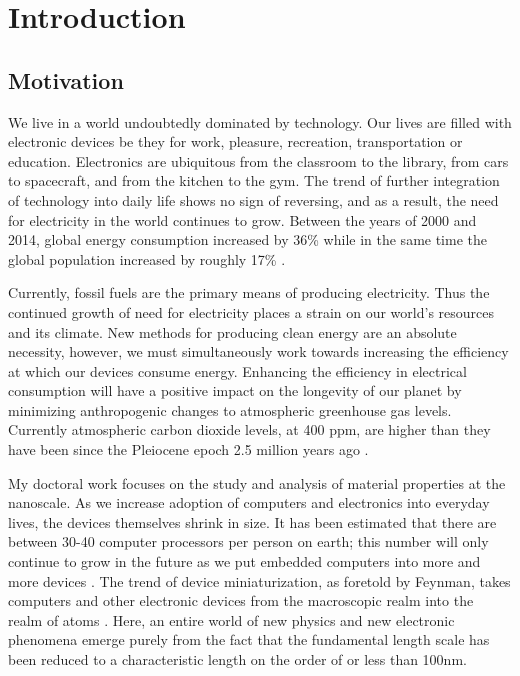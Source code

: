 \chapter{\sc Introduction}
\label{ch:Introduction}

\section{Motivation}
We live in a world undoubtedly dominated by technology. Our lives are filled with electronic devices be they for work, pleasure, recreation, transportation or education. Electronics are ubiquitous from the classroom to the library, from cars to spacecraft, and from the kitchen to the gym. The trend of further integration of technology into daily life shows no sign of reversing, and as a result, the need for electricity in the world continues to grow. Between the years of 2000 and 2014, global energy consumption increased by 36\% while in the same time the global population increased by roughly 17\% \cite{enerdata, popdata}.

Currently, fossil fuels are the primary means of producing electricity. Thus the continued growth of need for electricity places a strain on our world's resources and its climate. New methods for producing clean energy are an absolute necessity, however, we must simultaneously work towards increasing the efficiency at which our devices consume energy. Enhancing the efficiency in electrical consumption will have a positive impact on the longevity of our planet by minimizing anthropogenic changes to atmospheric greenhouse gas levels. Currently atmospheric carbon dioxide levels, at 400 ppm, are higher than they have been since the Pleiocene epoch 2.5 million years ago \cite{400ppm}.

My doctoral work focuses on the study and analysis of material properties at the nanoscale. As we increase adoption of computers and electronics into everyday lives, the devices themselves shrink in size. It has been estimated that there are between 30-40 computer processors per person on earth; this number will only continue to grow in the future as we put embedded computers into more and more devices \cite{cs3}. The trend of device miniaturization, as foretold by Feynman, takes computers and other electronic devices from the macroscopic realm into the realm of atoms \cite{Feynman}. Here, an entire world of new physics and new electronic phenomena emerge purely from the fact that the fundamental length scale has been reduced to a characteristic length on the order of or less than 100nm.

